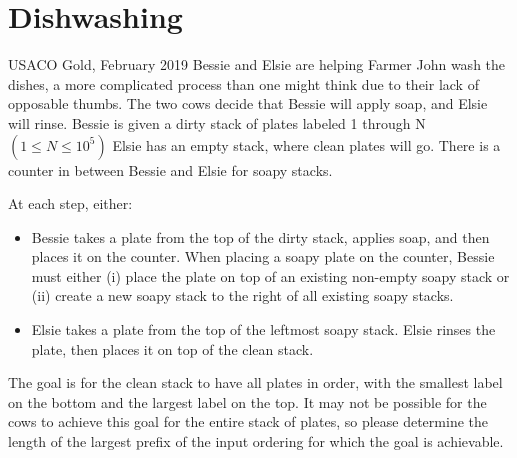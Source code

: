 \documentclass{article}
\begin{document}
\section{Dishwashing}
USACO Gold, February 2019
Bessie and Elsie are helping Farmer John wash the dishes, a more complicated process than one might think due to their lack of opposable thumbs.
The two cows decide that Bessie will apply soap, and Elsie will rinse. Bessie is given a dirty stack of plates labeled 1 through N $(1\leq N\leq 10^5)$ Elsie has an empty stack, where clean plates will go. There is a counter in between Bessie and Elsie for soapy stacks.

At each step, either:
\begin{itemize}
    \item Bessie takes a plate from the top of the dirty stack, applies soap, and then places it on the counter. When placing a soapy plate on the counter, Bessie must either (i) place the plate on top of an existing non-empty soapy stack or (ii) create a new soapy stack to the right of all existing soapy stacks.
    \item Elsie takes a plate from the top of the leftmost soapy stack. Elsie rinses the plate, then places it on top of the clean stack.
\end{itemize}
The goal is for the clean stack to have all plates in order, with the smallest label on the bottom and the largest label on the top. It may not be possible for the cows to achieve this goal for the entire stack of plates, so please determine the length of the largest prefix of the input ordering for which the goal is achievable.
\end{document}
